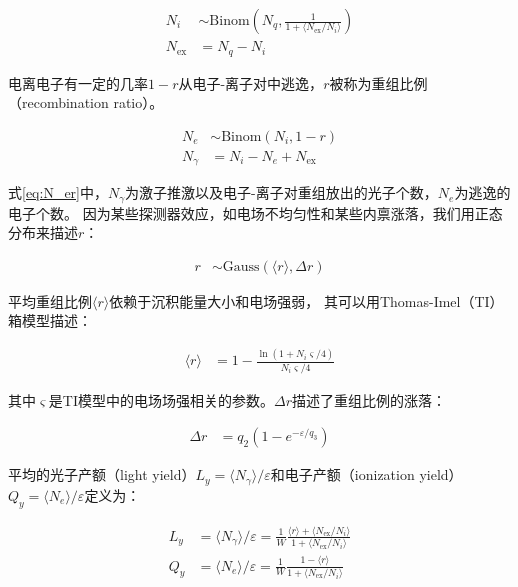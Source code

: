 \begin{align}
    \label{eq:N_iex}
    N_i &\sim \mathrm{Binom}\left(N_q,\frac{1}{1+\langle N_{\mathrm{ex}}/N_{i}\rangle}\right) \\
    N_{\mathrm{ex}} &= N_q - N_i
\end{align}

电离电子有一定的几率$1-r$从电子-离子对中逃逸，$r$被称为重组比例（\mbox{recombination} ratio）。

\begin{align}
    \label{eq:N_er}
    N_e &\sim \mathrm{Binom}\left(N_i,1-r\right) \\
    N_\gamma &= N_i - N_e + N_{\mathrm{ex}}
\end{align}

式\ref{eq:N_er}中，$N_\gamma$为激子推激以及电子-离子对重组放出的光子个数，$N_{e}$为逃逸的电子个数。
因为某些探测器效应，如电场不均匀性和某些内禀涨落\cite{lux_collaboration_tritium_2016}，我们用正态分布来描述$r$：

\begin{align}
    \label{eq:r}
    r &\sim \mathrm{Gauss}\left(\langle r\rangle,\Delta r\right)
\end{align}

平均重组比例$\langle r\rangle$依赖于沉积能量大小和电场强弱，
其可以用Thomas-Imel（TI）箱模型描述\cite{thomas_recombination_1987}：

\begin{align}
    \label{eq:mr}
    \langle r\rangle &= 1 - \frac{\ln{\left(1+N_i\varsigma/4\right)}}{N_i\varsigma/4}
\end{align}

其中$\varsigma$是TI模型中的电场场强相关的参数。$\Delta r$描述了重组比例的涨落：

\begin{align}
    \label{eq:sr}
    \Delta r &= q_2\left(1-e^{-\varepsilon /q_3}\right)
\end{align}

平均的光子产额（light yield）$L_y=\langle N_\gamma\rangle/\varepsilon $和电子产额（ionization yield）$Q_y=\langle N_e\rangle/\varepsilon $定义为：

\begin{align}
    \label{eq:N_g}
    L_y &= \langle N_\gamma\rangle/\varepsilon  = \frac{1}{W}\frac{\langle r\rangle+\langle N_{\mathrm{ex}}/N_i\rangle}{1+\langle N_{\mathrm{ex}}/N_i\rangle} \\
    \label{eq:N_e}
    Q_y &= \langle N_e\rangle/\varepsilon  = \frac{1}{W}\frac{1-\langle r\rangle}{1+\langle N_{\mathrm{ex}}/N_i\rangle}
\end{align}

